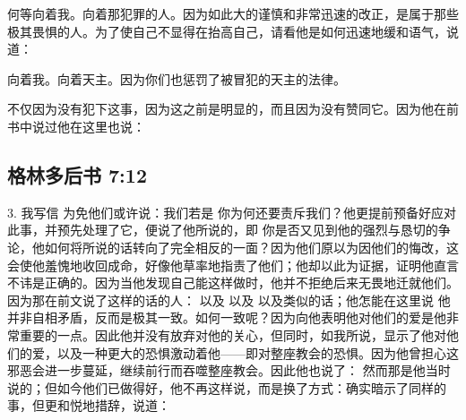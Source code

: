 何等向着我。向着那犯罪的人。因为如此大的谨慎和非常迅速的改正，是属于那些极其畏惧的人。为了使自己不显得在抬高自己，请看他是如何迅速地缓和语气，说道：\par

向着我。向着天主。因为你们也惩罚了被冒犯的天主的法律。\par

不仅因为没有犯下这事，因为这之前是明显的，而且因为没有赞同它。因为他在前书中说过他在这里也说：\par


\subsection{格林多后书 7:12}

3.  我写信  为免他们或许说：我们若是  你为何还要责斥我们？他更提前预备好应对此事，并预先处理了它，便说了他所说的，即   你是否又见到他的强烈与恳切的争论，他如何将所说的话转向了完全相反的一面？因为他们原以为因他们的悔改，这会使他羞愧地收回成命，好像他草率地指责了他们；他却以此为证据，证明他直言不讳是正确的。因为当他发现自己能这样做时，他并不拒绝后来无畏地迁就他们。因为那在前文说了这样的话的人：  以及   以及   以及类似的话；他怎能在这里说  他并非自相矛盾，反而是极其一致。如何一致呢？因为向他表明他对他们的爱是他非常重要的一点。因此他并没有放弃对他的关心，但同时，如我所说，显示了他对他们的爱，以及一种更大的恐惧激动着他——即对整座教会的恐惧。因为他曾担心这邪恶会进一步蔓延，继续前行而吞噬整座教会。因此他也说了：  然而那是他当时说的；但如今他们已做得好，他不再这样说，而是换了方式：确实暗示了同样的事，但更和悦地措辞，说道：\par

